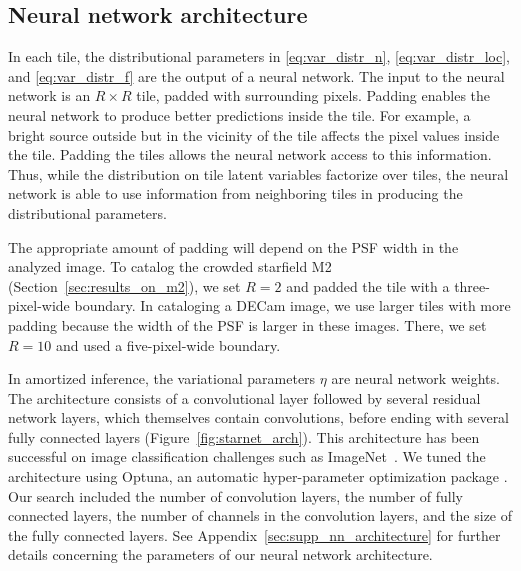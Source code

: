\subsection{Neural network architecture}
\label{sec:nn_architecture}

In each tile, the distributional parameters in \eqref{eq:var_distr_n},
\eqref{eq:var_distr_loc}, and \eqref{eq:var_distr_f} are the output of a neural network.
The input to the neural network is an $R \times R$ tile, padded with surrounding pixels.
Padding enables the neural network to produce better predictions inside the tile.
For example, a bright source outside but in the vicinity of the tile affects the pixel values inside the tile.
Padding the tiles allows the neural network access to this information.
Thus, while the distribution on tile latent variables factorize over tiles, the neural network is able to use information from neighboring tiles in producing the distributional parameters.

The appropriate amount of padding will depend on the PSF width in the analyzed image.
To catalog the crowded starfield M2 (Section~\ref{sec:results_on_m2}),
we set $R = 2$ and padded the tile with a three-pixel-wide boundary.
In cataloging a DECam image, we use larger tiles with more padding because the width of the PSF is larger in these images. There, we set $R = 10$ and used a five-pixel-wide boundary.


In amortized inference, the variational parameters $\eta$ are neural network weights.
The architecture consists of a convolutional layer followed by several residual network layers, which themselves contain convolutions, before ending with several fully connected layers (Figure~\ref{fig:starnet_arch}).
This architecture has been successful on image classification challenges such as ImageNet~\citep{imagenet2015}.
We tuned the architecture using Optuna, an automatic hyper-parameter optimization package \citep{optuna_2019}. 
Our search included the number of convolution layers, 
the number of fully connected layers,
the number of channels in the convolution layers, and the size of the fully connected layers. 
See Appendix~\ref{sec:supp_nn_architecture} for further details 
concerning the parameters of our neural network architecture. 


